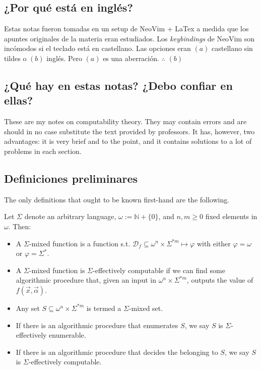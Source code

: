 \documentclass[a4paper, 12pt]{article}
\begin{document}
\subsection{¿Por qué está en inglés?}

Estas notas fueron tomadas en un setup de NeoVim + LaTex a medida que los
apuntes originales de la materia eran estudiados. Los \textit{keybindings} de
NeoVim son incómodos si el teclado está en castellano. Las opciones eran $(a)$
castellano sin tildes o $(b)$ inglés. Pero $(a)$ es una aberración. $\therefore
$ $(b)$

\subsection{¿Qué hay en estas notas? ¿Debo confiar en ellas?}

These are my notes on computability theory. They may contain errors and are
should in no case substitute the text provided by professors. It has, however,
two advantages: it is very brief and to the point, and it contains solutions to
a lot of problems in each section.

\subsection{Definiciones preliminares}

The only definitions that ought to be known first-hand are the following.

Let $\Sigma$ denote an arbitrary language, $\omega := \mathbb{N} + \{
0\}$, and $n, m \geq 0$ fixed elements in $\omega$. Then: 

\begin{itemize}
    \item A $\Sigma$-mixed function is a function s.t. $\mathcal{D}_f \subseteq
        \omega^n \times \Sigma^{*m} \mapsto \varphi$ with either $\varphi =
        \omega$ or $\varphi = \Sigma^{*}$.
    \item A $\Sigma$-mixed function is $\Sigma$-effectively computable if we can
        find some algorithmic procedure that, given an input in $\omega^n \times
        \Sigma^{*m}$, outputs the value of $f(\overrightarrow{x},
        \overrightarrow{\alpha})$. 
    \item Any set $S \subseteq \omega^{n} \times \Sigma^{*m}$ is termed a
        $\Sigma$-mixed set. 
    \item If there is an algorithmic procedure that enumerates $S$, we say $S$
        is $\Sigma$-effectively enumerable. 

    \item If there is an algorithmic procedure that decides the belonging to
        $S$, we say $S$ is $\Sigma$-effectively computable.
\end{itemize}
\end{document}
